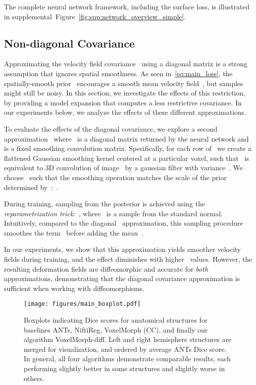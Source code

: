 \documentclass{article}
\begin{document}
The complete neural network framework, including the surface loss, is illustrated in supplemental~Figure~\ref{fig:sup:network_overview_simple}.




\subsection{Non-diagonal Covariance}
\label{sec:nondiag-approx}


{\color{blue} Approximating the velocity field covariance~ using a diagonal matrix is a strong assumption that ignores spatial smoothness. As seen in~\eqref{eq:main_loss}, the spatially-smooth prior~ encourages a smooth mean velocity field~, but samples~\mbox{} might still be noisy. In this section, we investigate the effects of this restriction, by providing a model expansion that computes a less restrictive covariance. In our experiments below, we analyze the effects of these different approximations.}


To evaluate the effects of the diagonal covariance, we explore a second approximation~ where~ is a diagonal matrix returned by the neural network and~ is a fixed smoothing convolution matrix.  Specifically, for each row of~ we create a flattened Gaussian smoothing kernel centered at a particular voxel, such that~ is equivalent to 3D convolution of image~ by a gaussian filter with variance~. We choose~ such that the smoothing operation matches the scale of the prior~ determined by~:~. 

During training, sampling from the posterior is achieved using the \textit{reparametrization trick}:~, where~ is a sample from the standard normal. Intuitively, compared to the diagonal~ approximation, this sampling procedure smoothes the term~ before adding the mean~.

In our experiments, we show that this approximation yields smoother velocity fields during training, and the effect diminishes with higher~ values. However, the resulting deformation fields are diffeomorphic and accurate for \textit{both} approximations, demonstrating that the diagonal covariance approximation is sufficient when working with diffeomorphisms.



 

\begin{figure*}[tb!]
	\begin{center}
		\texttt{[image: figures/main\_boxplot.pdf]}
	\end{center}
	\caption{Boxplots indicating Dice scores for anatomical structures for baselines ANTs, NiftiReg, VoxelMorph (CC), and finally our algorithm VoxelMorph-diff. Left and right hemisphere structures are merged for visualization, and ordered by average ANTs Dice score. In general, all four algorithms demonstrate comparable results, each performing slightly better in some structures and slightly worse in others. }
	\label{fig:boxplot}
\end{figure*}
\end{document}
